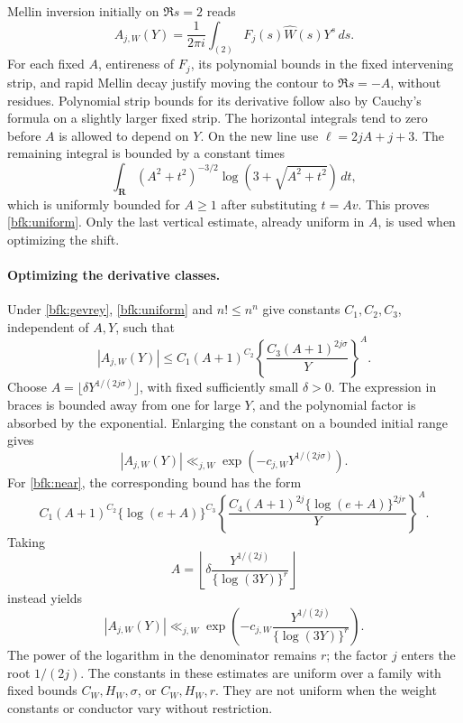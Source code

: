 Mellin inversion initially on \(\Re s=2\) reads
\[
 A_{j,W}(Y)=\frac1{2\pi i}
          \int_{(2)}F_j(s)\widehat W(s)Y^s\,ds.
\]
For each fixed \(A\), entireness of \(F_j\), its polynomial bounds
in the fixed intervening strip, and rapid Mellin decay justify
moving the contour to \(\Re s=-A\), without residues.
Polynomial strip bounds for its derivative follow also by
Cauchy's formula on a slightly larger fixed strip.
The horizontal integrals tend to zero before \(A\) is allowed to
depend on \(Y\).
On the new line use \(\ell=2jA+j+3\).  The remaining integral is
bounded by a constant times
\[
 \int_{\mathbf R}(A^2+t^2)^{-3/2}
             \log(3+\sqrt{A^2+t^2})\,dt,
\]
which is uniformly bounded for \(A\ge1\) after substituting
\(t=Av\).  This proves \eqref{bfk:uniform}.
Only the last vertical estimate, already uniform in \(A\), is
used when optimizing the shift.

\paragraph{Optimizing the derivative classes.}
Under \eqref{bfk:gevrey}, \eqref{bfk:uniform} and \(n!\le n^n\)
give constants \(C_1,C_2,C_3\), independent of \(A,Y\), such that
\[
 |A_{j,W}(Y)|
 \le C_1(A+1)^{C_2}
       \left\{\frac{C_3(A+1)^{2j\sigma}}Y\right\}^{A}.
\]
Choose \(A=\lfloor\delta Y^{1/(2j\sigma)}\rfloor\), with fixed
sufficiently small \(\delta>0\).  The expression in braces is
bounded away from one for large \(Y\), and the polynomial factor
is absorbed by the exponential.  Enlarging the constant on a
bounded initial range gives
\begin{equation}
 |A_{j,W}(Y)|\ll_{j,W}
        \exp(-c_{j,W}Y^{1/(2j\sigma)}).
 \label{bfk:gevrey-decay}
\end{equation}
For \eqref{bfk:near}, the corresponding bound has the form
\[
 C_1(A+1)^{C_2}\{\log(e+A)\}^{C_3}
 \left\{\frac{C_4(A+1)^{2j}
                    \{\log(e+A)\}^{2jr}}Y\right\}^{A}.
\]
Taking
\[
 A=\left\lfloor
       \delta\frac{Y^{1/(2j)}}{\{\log(3Y)\}^{r}}
    \right\rfloor
\]
instead yields
\begin{equation}
 |A_{j,W}(Y)|\ll_{j,W}
 \exp\left(-c_{j,W}
             \frac{Y^{1/(2j)}}{\{\log(3Y)\}^{r}}\right).
 \label{bfk:near-decay}
\end{equation}
The power of the logarithm in the denominator remains \(r\);
the factor \(j\) enters the root \(1/(2j)\).
The constants in these estimates are uniform over a family with
fixed bounds \(C_W,H_W,\sigma\), or \(C_W,H_W,r\).
They are not uniform when the weight constants or conductor vary
without restriction.

